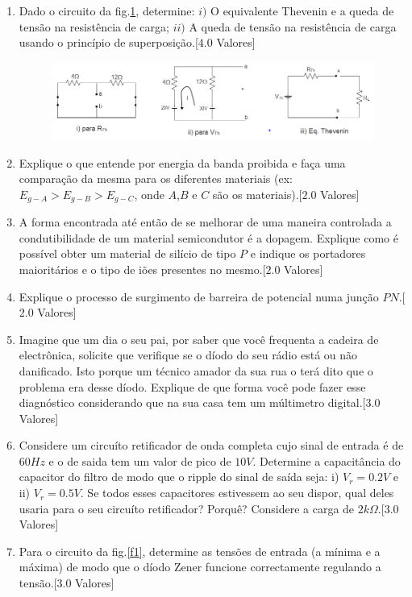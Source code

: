 \documentclass[12pt,a4paper,twoside]{report}
\begin{document}
\begin{enumerate}
\item Dado o circuito da fig.\ref{f2}, determine: $i)$ O equivalente Thevenin e a queda de tensão na resistência de carga; $ii)$ A queda de tensão na resistência de carga usando o princípio de superposição.[$4.0$ Valores]
\begin{figure}[H]
\centering
\includegraphics[scale=1]{Thevenin}
\caption{}
\label{f2}
\end{figure}
\item Explique o que entende por energia da banda proibida e fa\c ca uma compara\c c\~ao da mesma para os diferentes materiais (ex: $E_{g-A}>E_{g-B}>E_{g-C}$, onde $A$,$B$ e $C$ s\~ao os materiais).[$2.0$ Valores]
\item A forma encontrada at\'e ent\~ao de se melhorar de uma maneira controlada a condutibilidade de um material semicondutor \'e a dopagem. Explique como \'e poss\'ivel obter um material de sil\'icio de tipo $P$ e indique os portadores maiorit\'arios e o tipo de i\~oes presentes no mesmo.[$2.0$ Valores]
\item Explique o processo de surgimento de barreira de potencial numa jun\c c\~ao $PN$.[$2.0$ Valores]
\item Imagine que um dia o seu pai, por saber que voc\^e frequenta a cadeira de electr\^onica, solicite que verifique se o d\'iodo do seu r\'adio est\'a ou n\~ao danificado. Isto porque um t\'ecnico amador da sua rua o ter\'a dito que o problema era desse d\'iodo. Explique de que forma voc\^e pode fazer esse diagn\'ostico considerando que na sua casa tem um m\'ultimetro digital.[$3.0$ Valores]
\item Considere um circu\'ito retificador de onda completa cujo  sinal de entrada \'e de $60 Hz$ e o de saida tem um valor de pico de $10V$. Determine a capacit\^ancia do capacitor do filtro de modo que o ripple do sinal de sa\'ida seja: i) $V_r=0.2V$ e ii) $V_r=0.5V$. Se todos esses capacitores estivessem ao seu dispor, qual deles usaria para o seu circu\'ito retificador? Porqu\^e? Considere a carga de $2k\Omega$.[$3.0$ Valores]
\item Para o circuito da fig.\ref{f1}, determine as tensões de entrada (a mínima e a máxima) de modo que o díodo Zener funcione correctamente regulando a tens\~ao.[$3.0$ Valores]

\end{enumerate}
\end{document}

